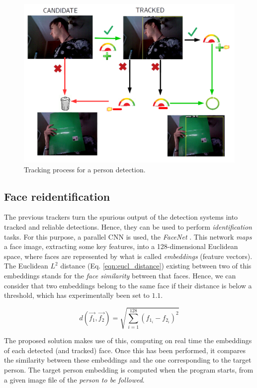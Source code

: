 \begin{figure}[h]
	\centering
	\includegraphics[width=12cm]{images/person_tracker}
	\caption{Tracking process for a person detection.}
	\label{fig:perception_tracker}
\end{figure}


\subsection{Face reidentification}

The previous trackers turn the spurious output of the detection systems into tracked and reliable detections. Hence, they can be used to perform \emph{identification} tasks. For this purpose, a parallel CNN is used, the \emph{FaceNet} \cite{facenet}. This network \emph{maps} a face image, extracting some key features, into a 128-dimensional Euclidean space, where faces are represented by what is called \emph{embeddings} (feature vectors). The Euclidean $L^2$ distance (Eq. \ref{eqn:eucl_distance}) existing between two of this embeddings stands for the \emph{face similarity} between that faces. Hence, we can consider that two embeddings belong to the same face if their distance is below a threshold, which has experimentally been set to $1.1$.

\begin{equation}
d(\vec{f_1}, \vec{f_2}) = \sqrt{\sum_{i=1}^{128}(f_{1_i} - f_{2_i})^2}
\label{eqn:eucl_distance}
\end{equation}

The proposed solution makes use of this, computing on real time the embeddings of each detected (and tracked) face. Once this has been performed, it compares the similarity between these embeddings and the one corresponding to the target person. The target person embedding is computed when the program starts, from a given image file of the \emph{person to be followed}.

